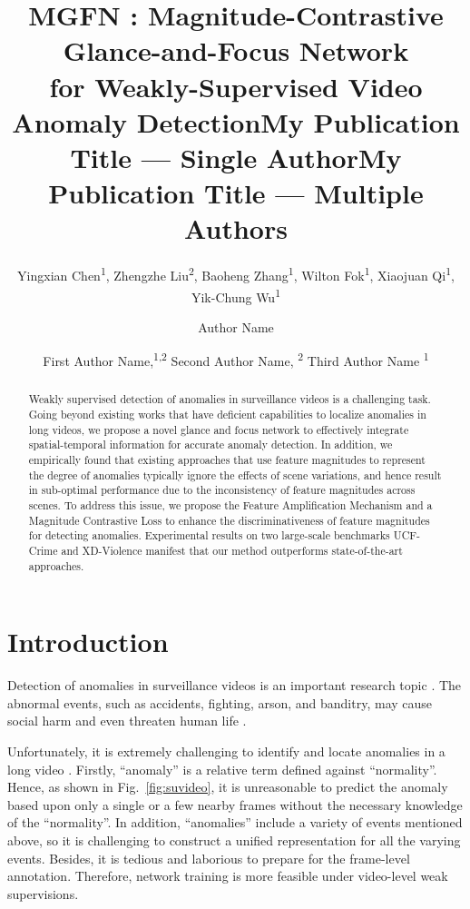 \documentclass[letterpaper]{article} \usepackage{aaai23}  \usepackage{times}  \usepackage{helvet}  \usepackage{courier}  \usepackage[hyphens]{url}  \usepackage{graphicx} \urlstyle{rm} \def\UrlFont{\rm}  \usepackage{natbib}  \usepackage{caption} \frenchspacing  \setlength{\pdfpagewidth}{8.5in}  \setlength{\pdfpageheight}{11in}  \usepackage{algorithm}
\title{MGFN : Magnitude-Contrastive Glance-and-Focus Network \\for Weakly-Supervised Video
Anomaly Detection}
\author{
Yingxian Chen\textsuperscript{1},
    Zhengzhe Liu\textsuperscript{2},
    Baoheng Zhang\textsuperscript{1},
    Wilton Fok\textsuperscript{1},
    Xiaojuan Qi\textsuperscript{1},
    Yik-Chung Wu\textsuperscript{1}
}
\title{My Publication Title --- Single Author}
\author {
    Author Name
}
\title{My Publication Title --- Multiple Authors}
\author {
First Author Name,\textsuperscript{\rm 1,\rm 2}
    Second Author Name, \textsuperscript{\rm 2}
    Third Author Name \textsuperscript{\rm 1}
}
\begin{document}
\maketitle

\begin{abstract}
Weakly supervised detection of anomalies in surveillance videos is a challenging task. Going beyond existing works that have deficient capabilities to localize anomalies in long videos, we propose a novel glance and focus network to effectively integrate spatial-temporal information for accurate anomaly detection. In addition, we empirically found that existing approaches that use feature magnitudes to represent the degree of anomalies typically ignore the effects of scene variations, and hence result in sub-optimal performance due to the inconsistency of feature magnitudes across scenes. To address this issue, we propose the Feature Amplification Mechanism and a Magnitude Contrastive Loss to enhance the discriminativeness of feature magnitudes for detecting anomalies. Experimental results on two large-scale benchmarks UCF-Crime and XD-Violence manifest that our method outperforms state-of-the-art approaches. 
\end{abstract}

\section{Introduction}

\noindent Detection of anomalies in surveillance videos is an important research topic \cite{survey1,survey2}. The abnormal events, such as accidents, fighting, arson, and banditry, may cause social harm and even threaten human life \cite{survey3}. 



Unfortunately, it is extremely challenging to identify and locate anomalies in a long video \cite{challen-1,challen-2,challen-3,challen-4}. Firstly, ``anomaly'' is a relative term defined against ``normality''. Hence, as shown in Fig.~\ref{fig:suvideo}, it is unreasonable to predict the anomaly based upon only a single or a few nearby frames without the necessary knowledge of the ``normality''. In addition, ``anomalies'' include a variety of events mentioned above, so it is challenging to construct a unified representation for all the varying events.  Besides, it is tedious and laborious to prepare for the frame-level annotation. Therefore, network training is more feasible under  video-level weak supervisions. 
\end{document}
